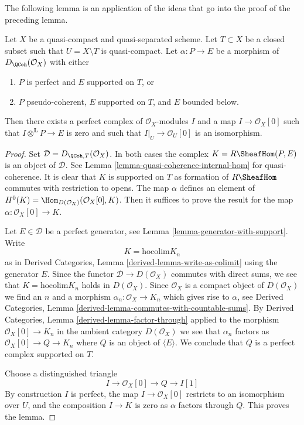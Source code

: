 \noindent
The following lemma is an application of the ideas that go into
the proof of the preceding lemma.

\begin{lemma}
\label{lemma-map-from-pseudo-coherent-to-complex-with-support}
Let $X$ be a quasi-compact and quasi-separated scheme. Let $T \subset X$
be a closed subset such that $U = X \setminus T$ is quasi-compact.
Let $\alpha : P \to E$ be a morphism of $D_\QCoh(\mathcal{O}_X)$ with
either
\begin{enumerate}
\item $P$ is perfect and $E$ supported on $T$, or
\item $P$ pseudo-coherent, $E$ supported on $T$, and $E$ bounded below.
\end{enumerate}
Then there exists a perfect complex of $\mathcal{O}_X$-modules $I$
and a map $I \to \mathcal{O}_X[0]$ such that
$I \otimes^\mathbf{L} P \to E$ is zero and such that
$I|_U \to \mathcal{O}_U[0]$ is an
isomorphism.
\end{lemma}

\begin{proof}
Set $\mathcal{D} = D_{\QCoh, T}(\mathcal{O}_X)$. In both cases the complex
$K = R\SheafHom(P, E)$ is an object of $\mathcal{D}$. See
Lemma \ref{lemma-quasi-coherence-internal-hom} for quasi-coherence.
It is clear that $K$ is supported on $T$ as formation of $R\SheafHom$
commutes with restriction to opens.
The map $\alpha$ defines an element of
$H^0(K) = \Hom_{D(\mathcal{O}_X)}(\mathcal{O}_X[0], K)$.
Then it suffices to prove the result for the map
$\alpha : \mathcal{O}_X[0] \to K$.

\medskip\noindent
Let $E \in \mathcal{D}$ be a perfect generator, see
Lemma \ref{lemma-generator-with-support}. Write
$$
K = \text{hocolim} K_n
$$
as in Derived Categories, Lemma \ref{derived-lemma-write-as-colimit}
using the generator $E$. Since the functor $\mathcal{D} \to D(\mathcal{O}_X)$
commutes with direct sums, we see that $K = \text{hocolim} K_n$
holds in $D(\mathcal{O}_X)$. Since $\mathcal{O}_X$ is a compact
object of $D(\mathcal{O}_X)$ we find an $n$ and a morphism
$\alpha_n : \mathcal{O}_X \to K_n$ which gives rise to $\alpha$, see
Derived Categories, Lemma \ref{derived-lemma-commutes-with-countable-sums}.
By Derived Categories, Lemma \ref{derived-lemma-factor-through}
applied to the morphism $\mathcal{O}_X[0] \to K_n$ in the ambient
category $D(\mathcal{O}_X)$ we see that $\alpha_n$ factors as
$\mathcal{O}_X[0] \to Q \to K_n$ where $Q$ is an object
of $\langle E \rangle$. We conclude that $Q$ is a perfect complex
supported on $T$.

\medskip\noindent
Choose a distinguished triangle
$$
I \to \mathcal{O}_X[0] \to Q \to I[1]
$$
By construction $I$ is perfect, the map $I \to \mathcal{O}_X[0]$
restricts to an isomorphism over $U$, and the composition
$I \to K$ is zero as $\alpha$ factors through $Q$.
This proves the lemma.
\end{proof}






